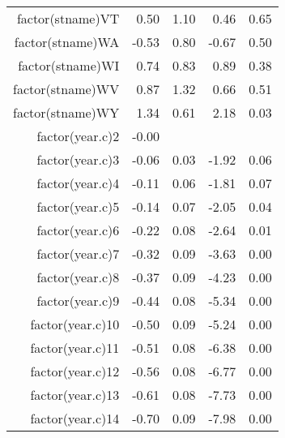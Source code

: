 \begin{table}[ht]
\begin{tabular}{rrrrr}
  factor(stname)VT & 0.50 & 1.10 & 0.46 & 0.65 \\ 
  factor(stname)WA & -0.53 & 0.80 & -0.67 & 0.50 \\ 
  factor(stname)WI & 0.74 & 0.83 & 0.89 & 0.38 \\ 
  factor(stname)WV & 0.87 & 1.32 & 0.66 & 0.51 \\ 
  factor(stname)WY & 1.34 & 0.61 & 2.18 & 0.03 \\ 
  factor(year.c)2 & -0.00 &  &  &  \\ 
  factor(year.c)3 & -0.06 & 0.03 & -1.92 & 0.06 \\ 
  factor(year.c)4 & -0.11 & 0.06 & -1.81 & 0.07 \\ 
  factor(year.c)5 & -0.14 & 0.07 & -2.05 & 0.04 \\ 
  factor(year.c)6 & -0.22 & 0.08 & -2.64 & 0.01 \\ 
  factor(year.c)7 & -0.32 & 0.09 & -3.63 & 0.00 \\ 
  factor(year.c)8 & -0.37 & 0.09 & -4.23 & 0.00 \\ 
  factor(year.c)9 & -0.44 & 0.08 & -5.34 & 0.00 \\ 
  factor(year.c)10 & -0.50 & 0.09 & -5.24 & 0.00 \\ 
  factor(year.c)11 & -0.51 & 0.08 & -6.38 & 0.00 \\ 
  factor(year.c)12 & -0.56 & 0.08 & -6.77 & 0.00 \\ 
  factor(year.c)13 & -0.61 & 0.08 & -7.73 & 0.00 \\ 
  factor(year.c)14 & -0.70 & 0.09 & -7.98 & 0.00 \\ 
   \hline
\end{tabular}
\end{table}
